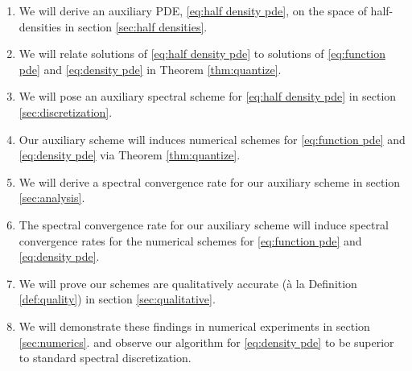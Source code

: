 \documentclass[final,leqno]{siamltex1213}
\begin{document}
\begin{enumerate}
	\item We will derive an auxiliary PDE, \eqref{eq:half density pde}, on the space of half-densities in section \ref{sec:half densities}.
	\item We will relate solutions of \eqref{eq:half density pde} to solutions of \eqref{eq:function pde} and \eqref{eq:density pde}  in Theorem \ref{thm:quantize}.
	\item We will pose an auxiliary spectral scheme for \eqref{eq:half density pde} in section \ref{sec:discretization}.
	\item Our auxiliary scheme will induces numerical schemes for \eqref{eq:function pde} and \eqref{eq:density pde} via Theorem \ref{thm:quantize}.
	\item We will derive a spectral convergence rate for our auxiliary scheme in section \ref{sec:analysis}.
	\item The spectral convergence rate for our auxiliary scheme will induce spectral convergence rates for the numerical schemes for \eqref{eq:function pde} and \eqref{eq:density pde}.
	\item We will prove our schemes are qualitatively accurate (\`a la Definition \ref{def:quality}) in section \ref{sec:qualitative}.
	\item We will demonstrate these findings in numerical experiments in section \ref{sec:numerics}.
	and observe our algorithm for \eqref{eq:density pde} to be superior to standard spectral discretization.
\end{enumerate}
\end{document}
